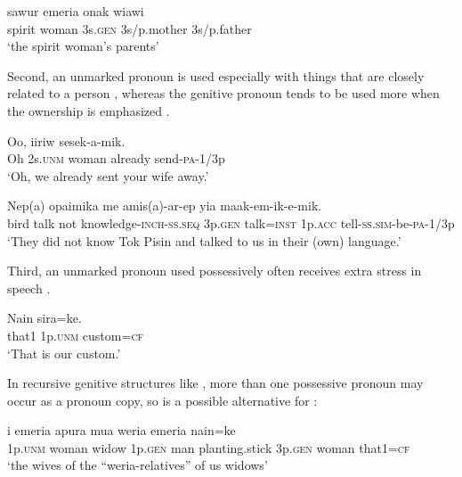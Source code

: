 \ea%
\label{ex:4:x410}
\gll sawur  emeria    onak  wiawi \\
    spirit  woman  3s.\textsc{gen}  3s/p.mother  3s/p.father  \\
\glt`the spirit woman's parents'
\z

Second, an unmarked pronoun is used especially with things that are closely related to a person , whereas the genitive pronoun tends to be used more when the ownership is emphasized  . 

\ea%
\label{ex:4:x1315}
\gll Oo,     iiriw  sesek-a-mik. \\
   Oh  2s.\textsc{unm}  woman  already  send-\textsc{pa}-1/3p   \\
\glt`Oh, we already sent your wife away.'
\z

\ea%
\label{ex:4:x1314}
\gll Nep(a)  opaimika  me  amis(a)-ar-ep     yia  maak-em-ik-e-mik.\\
    bird  talk  not  knowledge-\textsc{inch}-\textsc{ss}.\textsc{seq}  3p.\textsc{gen}  talk=\textsc{inst}  1p.\textsc{acc}  tell-\textsc{ss}.\textsc{sim}-be-\textsc{pa}-1/3p\\
\glt`They did not know Tok Pisin and talked to us in their (own) language.'
\z

Third, an unmarked pronoun used possessively often receives extra stress in speech .

\ea%
\label{ex:4:x408}
\gll Nain   sira=ke. \\
     that1  1p.\textsc{unm}  custom=\textsc{cf} \\
\glt`That is our custom.'
\z

In recursive genitive structures like , more than one possessive pronoun may occur as a pronoun copy, so  is a possible alternative for :

\ea%
\label{ex:4:x411}
\gll i  emeria  apura    mua  weria   emeria  nain=ke\\
  1p.\textsc{unm}  woman  widow  1p.\textsc{gen}  man  planting.stick  3p.\textsc{gen}  woman  that1=\textsc{cf}  \\
\glt`the wives of the ``weria-relatives'' of us widows'
\z


